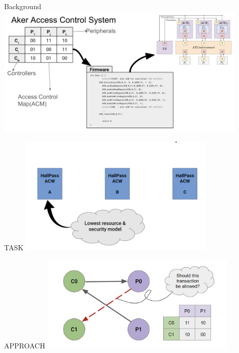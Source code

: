 \begin{frame}{Background}
    \centering
    \includegraphics[height=0.9\textheight,width=0.9\textwidth,keepaspectratio]{aker.png}
\end{frame}

\begin{frame}{TASK}
    \centering
    \includegraphics[height=0.7\textheight,width=0.7\textwidth,keepaspectratio]{models.png}
\end{frame}

\begin{frame}{APPROACH}
    \centering
    \includegraphics[height=0.7\textheight,width=0.7\textwidth,keepaspectratio]{graph_w_acm.png}
\end{frame}

